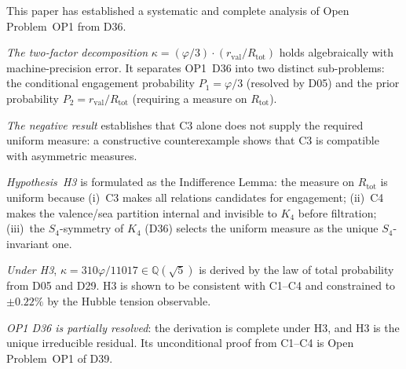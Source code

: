 \documentclass[11pt,a4paper]{article}
\theoremstyle{definition}
\newcommand{\Kfour}{K_4}
\newcommand{\rval}{r_{\mathrm{val}}}
\newcommand{\Rtot}{R_{\mathrm{tot}}}
\newcommand{\vp}{\varphi}
\newcommand{\kap}{\kappa}
\begin{document}
This paper has established a systematic and complete analysis of
Open Problem~OP1 from D36.

\emph{The two-factor decomposition} $\kap = (\vp/3)\cdot(\rval/\Rtot)$
holds algebraically with machine-precision error. It separates OP1~D36
into two distinct sub-problems: the conditional engagement probability
$P_1 = \vp/3$ (resolved by D05) and the prior probability
$P_2 = \rval/\Rtot$ (requiring a measure on $\Rtot$).

\emph{The negative result} establishes that C3 alone does not supply
the required uniform measure: a constructive counterexample shows
that C3 is compatible with asymmetric measures.

\emph{Hypothesis~H3} is formulated as the Indifference Lemma: the
measure on $\Rtot$ is uniform because (i)~C3 makes all relations
candidates for engagement; (ii)~C4 makes the valence/sea partition
internal and invisible to $\Kfour$ before filtration; (iii)~the
$S_4$-symmetry of $\Kfour$ (D36) selects the uniform measure as
the unique $S_4$-invariant one.

\emph{Under H3}, $\kap = 310\vp/11017 \in \mathbb{Q}(\sqrt{5})$
is derived by the law of total probability from D05 and D29.
H3 is shown to be consistent with C1--C4 and constrained to
$\pm 0.22\%$ by the Hubble tension observable.

\emph{OP1 D36 is partially resolved}: the derivation is complete
under H3, and H3 is the unique irreducible residual. Its
unconditional proof from C1--C4 is Open Problem~OP1 of D39.
\end{document}
